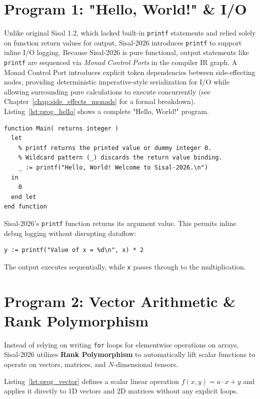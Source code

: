 \section{Program 1: "Hello, World!" \& I/O}
Unlike original Sisal 1.2, which lacked built-in \texttt{printf} statements and relied solely on function return values for output, Sisal-2026 introduces \texttt{printf} to support inline I/O logging. Because Sisal-2026 is pure functional, output statements like \texttt{printf} are sequenced via \emph{Monad Control Ports} in the compiler IR graph. A Monad Control Port introduces explicit token dependencies between side-effecting nodes, providing deterministic imperative-style serialization for I/O while allowing surrounding pure calculations to execute concurrently (see Chapter~\ref{chap:side_effects_monads} for a formal breakdown). Listing~\ref{lst:prog_hello} shows a complete "Hello, World!" program.

\begin{lstlisting}[caption={Hello World in Sisal-2026 (\texttt{hello.sis})},label={lst:prog_hello}]
function Main( returns integer )
  let
    % printf returns the printed value or dummy integer 0.
    % Wildcard pattern (_) discards the return value binding.
    _ := printf("Hello, World! Welcome to Sisal-2026.\n")
  in
    0
  end let
end function
\end{lstlisting}

\begin{tip}
Sisal-2026's \texttt{printf} function returns its argument value. This permits inline debug logging without disrupting dataflow:
\begin{lstlisting}
y := printf("Value of x = %d\n", x) * 2
\end{lstlisting}
The output executes sequentially, while \texttt{x} passes through to the multiplication.
\end{tip}

\section{Program 2: Vector Arithmetic \& Rank Polymorphism}
Instead of relying on writing \texttt{for} loops for elementwise operations on arrays, Sisal-2026 utilizes \textbf{Rank Polymorphism} to automatically lift scalar functions to operate on vectors, matrices, and $N$-dimensional tensors.

Listing~\ref{lst:prog_vector} defines a scalar linear operation $f(x, y) = a \cdot x + y$ and applies it directly to 1D vectors and 2D matrices without any explicit loops.

